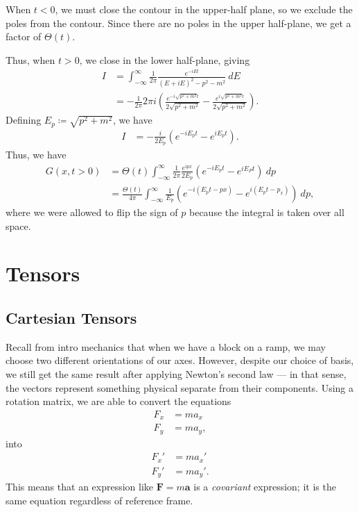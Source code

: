 \documentclass[10pt]{mypackage}
\begin{document}
  When $t < 0$, we must close the contour in the upper-half plane, so we exclude the poles from the contour. Since there are no poles in the upper half-plane, we get a factor of $\Theta(t)$.\newline

  Thus, when $t > 0$, we close in the lower half-plane, giving
  \begin{align*}
    I &= \int_{-\infty}^{\infty} \frac{1}{2\pi}\frac{e^{-iEt}}{\left( E + iE \right)^2 - p^2 - m^2}\:dE\\
      &= -\frac{1}{2\pi}2\pi i \left( \frac{e^{-i\sqrt{p^2 + m^2}t}}{2\sqrt{p^2 + m^2}} - \frac{e^{i\sqrt{p^2 + m^2}t}}{2\sqrt{p^2 + m^2}}\right).
  \end{align*}
  Defining $E_p\coloneq \sqrt{p^2 + m^2}$, we have
  \begin{align*}
    I &= -\frac{i}{2E_p}\left( e^{-iE_p t} - e^{iE_p t} \right).
  \end{align*}
  Thus, we have
  \begin{align*}
    G\left( x,t> 0 \right) &= \Theta\left( t \right)\int_{-\infty}^{\infty} \frac{1}{2\pi} \frac{e^{ipx}}{2E_p}\left( e^{-iE_p t} - e^{iE_P t} \right)\:dp\\
                           &= \frac{\Theta\left( t \right)}{4\pi} \int_{-\infty}^{\infty} \frac{1}{E_p}\left( e^{-i\left( E_p t - px \right)} - e^{i\left( E_p t - p_x \right)} \right)\:dp,
  \end{align*}
  where we were allowed to flip the sign of $p$ because the integral is taken over all space.
  \section{Tensors}%
  \subsection{Cartesian Tensors}%
  Recall from intro mechanics that when we have a block on a ramp, we may choose two different orientations of our axes. However, despite our choice of basis, we still get the same result after applying Newton's second law --- in that sense, the vectors represent something physical separate from their components. Using a rotation matrix, we are able to convert the equations
  \begin{align*}
    F_x &= ma_x\\
    F_y &= ma_y,
  \end{align*}
  into
  \begin{align*}
    F_x' &= ma_x'\\
    F_y' &= ma_y'.
  \end{align*}
  This means that an expression like $\mathbf{F} = m\mathbf{a}$ is a \textit{covariant} expression; it is the same equation regardless of reference frame.
\end{document}
